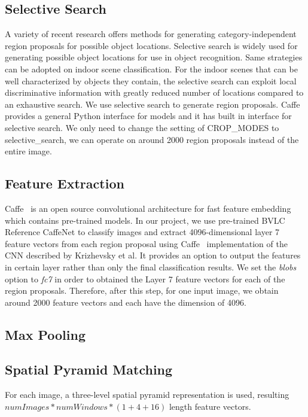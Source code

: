 \subsection{Selective Search}
A variety of recent research offers methods for generating category-independent
region proposals for possible object locations.
Selective search is widely used for generating possible object locations for
use in object recognition\cite{Uijlings:2013:SSO}. Same strategies can be
adopted on indoor scene classification. For the indoor scenes that can be well
characterized by objects they contain, the selective search can exploit local
discriminative information with greatly reduced number of locations compared
to an exhaustive search. We use selective search to generate region proposals.
Caffe provides a general Python interface for models and it has built in
interface for selective search. We only need to change the setting of CROP\_MODES
to selective\_search, we can operate on around 2000 region proposals instead of
the entire image.

\subsection{Feature Extraction}
Caffe~\cite{Jia:2014:CCA} is an open source convolutional architecture for
fast feature embedding which contains pre-trained models.
In our project, we use pre-trained BVLC Reference CaffeNet to classify images
and extract 4096-dimensional layer 7 feature vectors from each region
proposal using Caffe~\cite{Jia:2014:CCA} implementation of the CNN described by
Krizhevsky et al\cite{Krizhevsky:2012:ICD}. It provides an option to output the
features in certain layer rather than only the final classification results. We
set the \textit{blobs} option to \textit{fc7} in order to obtained the Layer
7 feature vectors for each of the region proposals. Therefore, after this step,
for one input image, we obtain around 2000 feature vectors and each have the
dimension of 4096.

\subsection{Max Pooling}

\subsection{Spatial Pyramid Matching}
For each image, a three-level spatial pyramid representation is used, resulting
$numImages * numWindows * (1 + 4 + 16)$ length feature vectors.

